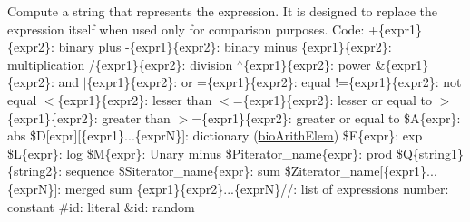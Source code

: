 Compute a string that represents the expression. It is designed to replace the expression itself when used only for comparison purposes. Code\+: +\{expr1\}\{expr2\}\+: binary plus -\/\{expr1\}\{expr2\}\+: binary minus \{expr1\}\{expr2\}\+: multiplication /\{expr1\}\{expr2\}\+: division $^\wedge$\{expr1\}\{expr2\}\+: power \&\{expr1\}\{expr2\}\+: and $\vert$\{expr1\}\{expr2\}\+: or =\{expr1\}\{expr2\}\+: equal !=\{expr1\}\{expr2\}\+: not equal $<$\{expr1\}\{expr2\}\+: lesser than $<$=\{expr1\}\{expr2\}\+: lesser or equal to $>$\{expr1\}\{expr2\}\+: greater than $>$=\{expr1\}\{expr2\}\+: greater or equal to \$A\{expr\}\+: abs \$D\mbox{[}expr\mbox{]}\mbox{[}\{expr1\}...\{exprN\}\mbox{]}\+: dictionary (\hyperlink{classbio_arith_elem}{bio\+Arith\+Elem}) \$E\{expr\}\+: exp \$L\{expr\}\+: log \$M\{expr\}\+: Unary minus \$\+Piterator\+\_\+name\{expr\}\+: prod \$Q\{string1\}\{string2\}\+: sequence \$\+Siterator\+\_\+name\{expr\}\+: sum \$\+Ziterator\+\_\+name\mbox{[}\{expr1\}...\{exprN\}\mbox{]}\+: merged sum \{expr1\}\{expr2\}...\{exprN\}//\+: list of expressions number\+: constant \#id\+: literal \&id\+: random 

